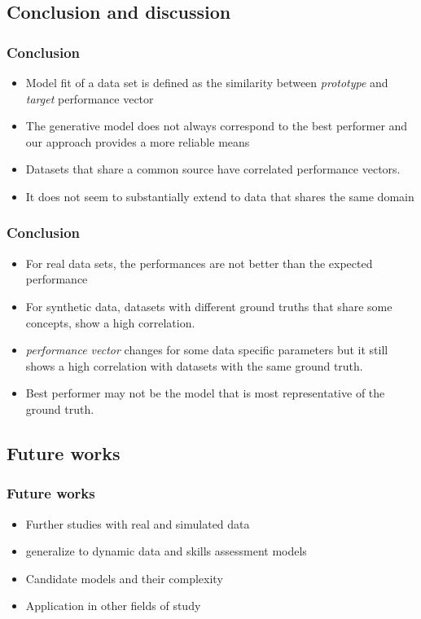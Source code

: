 \documentclass{beamer}
\begin{document}
\subsection{Conclusion and discussion}
\begin{frame}\frametitle{Conclusion}
\begin{itemize}
\item Model fit of a data set is defined as the similarity between \textit{prototype} and \textit{target} performance vector \pause
\item The generative model does not always correspond to the best performer and our approach provides a more reliable means \pause
\item Datasets that share a common source have correlated performance vectors. \pause %
\item It does not seem to substantially extend to data that shares the same domain
\end{itemize}
\end{frame}

\begin{frame}\frametitle{Conclusion}
\begin{itemize}
\item For real data sets, the performances are not better than the expected performance \pause %
\item For synthetic  data, datasets with different ground truths that share some concepts, show a high correlation. \pause
\item \textit{performance vector} changes for some data specific parameters but it still shows a high correlation with datasets with the same ground truth. \pause
\item Best performer may not be the model that is most representative of the ground truth.
\end{itemize}
\end{frame}

\subsection{Future works}
\begin{frame}\frametitle{Future works}
\begin{itemize}
\item Further studies with real and simulated data \pause
\item generalize to dynamic data and skills assessment models \pause
\item Candidate models and their complexity \pause
\item Application in other fields of study  
\end{itemize}
\end{frame}
\end{document}
